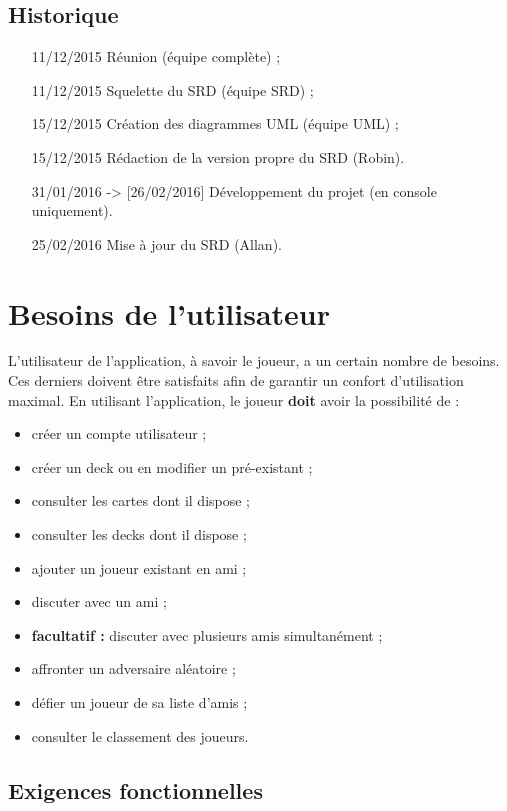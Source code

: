 \documentclass{article}
\begin{document}
	\subsection{Historique}
		\begin{itemize}
			\item[11/12/2015] Réunion (équipe complète) ;
			\item[11/12/2015] Squelette du SRD (équipe SRD) ;
			\item[15/12/2015] Création des diagrammes UML (équipe UML) ;
			\item[15/12/2015] Rédaction de la version propre du SRD (Robin).
			\item[31/01/2016] -> [26/02/2016] Développement du projet (en console uniquement).
			\item[25/02/2016]  Mise à jour du SRD (Allan).
		\end{itemize}

\newpage

\section{Besoins de l'utilisateur}
	L'utilisateur de l'application, à savoir le joueur, a un certain nombre de besoins. Ces derniers doivent être satisfaits afin de garantir un confort d'utilisation
	maximal. En utilisant l'application, le joueur \textbf{doit} avoir la possibilité de :

	\begin{itemize}
		\item créer un compte utilisateur ;
		\item créer un \gls{deck} ou en modifier un pré-existant ;
		\item consulter les cartes dont il dispose ;
		\item consulter les \glspl{deck} dont il dispose ;
		\item ajouter un joueur existant en ami ;
		\item discuter avec un ami ;
		\item \textbf{\gls{facultatif} :} discuter avec plusieurs amis simultanément ;
		\item affronter un adversaire aléatoire ;
		\item défier un joueur de sa liste d'amis ;
		\item consulter le classement des joueurs.
	\end{itemize}

	\subsection{Exigences fonctionnelles}
\end{document}
